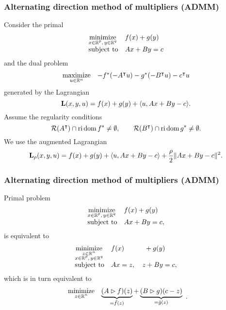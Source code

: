 \documentclass[10pt,mathserif]{beamer}
\begin{document}
\begin{frame}[label=frame_admm_first,plain]
\frametitle{Alternating direction method of multipliers (ADMM)}
Consider the primal
\[
\begin{array}{ll}
\underset{\substack{x\in \mathbb{R}^p,\,y\in \mathbb{R}^q}}{\mbox{minimize}}&f(x)+g(y)\\
\mbox{subject to}&Ax+By=c
\end{array}
\]
and the dual problem
\[
\begin{array}{ll}
\underset{u  \in \mathbb{R}^n}{\mbox{maximize}}&-f^*(-A^\intercal u )-g^*(-B^\intercal u )-c^\intercal u
\end{array}
\]
generated by the Lagrangian
\[
\mathbf{L}(x,y,u )=f(x)+g(y)+\langle u , Ax+By-c\rangle.
\]
Assume the regularity conditions
\[
{\mathcal{R}}(A^\intercal)\cap \mathrm{ri}\, \mathrm{dom}\, f^*\ne \emptyset\nonumber,\qquad
{\mathcal{R}}(B^\intercal)\cap \mathrm{ri}\, \mathrm{dom}\, g^*\ne \emptyset.
\]
We use the augmented Lagrangian
\[
\mathbf{L}_\rho (x,y,u )=f(x)+g(y)+\langle u , Ax+By-c\rangle+\frac{\rho}{2}\|Ax+By-c\|^2.
\]
\end{frame}

\begin{frame}
\frametitle{Alternating direction method of multipliers (ADMM)}
Primal problem
\[
\begin{array}{ll}
\underset{\substack{x\in \mathbb{R}^p,\,y\in \mathbb{R}^q}}{\mbox{minimize}}&f(x)+g(y)\\
\mbox{subject to}&Ax+By=c,
\end{array}
\]
 is equivalent to
\[
\begin{array}{ll}
\underset{\substack{z\in \mathbb{R}^n\\x\in \mathbb{R}^p,\,y\in \mathbb{R}^q}}{\mbox{minimize}}&f(x)\qquad\quad+g(y)\\
\mbox{subject to}&Ax=z,\quad z+By=c,
\end{array}
\]
which is in turn equivalent to
\[
\begin{array}{ll}
\underset{\substack{z\in\mathbb{R}^n}}{\mbox{minimize}}&
\underbrace{(A\rhd f)(z)}_{=\tilde{f}(z)}
+
\underbrace{(B\rhd g)(c-z)}_{=\tilde{g}(z)}
\end{array}.
\]
\end{frame}
\end{document}
